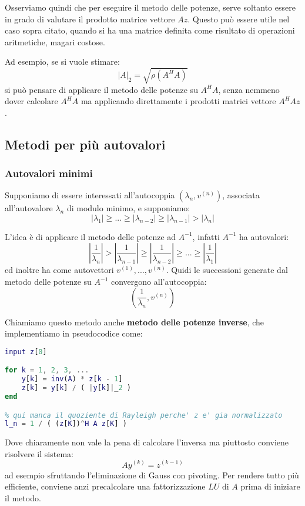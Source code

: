 \documentclass[a4paper,11pt]{article}
\begin{document}
Osserviamo quindi che per eseguire il metodo delle potenze, serve soltanto essere in grado di valutare il prodotto matrice vettore $A z$.
Questo può essere utile nel caso sopra citato, quando si ha una matrice definita come risultato di operazioni aritmetiche, magari costose.

Ad esempio, se si vuole stimare:
$$
|A|_2 = \sqrt{\rho(A^H A)}
$$
si può pensare di applicare il metodo delle potenze su $A^H A$, senza nemmeno dover calcolare $A^H A$ ma applicando direttamente i prodotti matrici vettore $A^H A z$.

\subsection{Metodi per più autovalori}
\subsubsection{Autovalori minimi}
Supponiamo di essere interessati all'autocoppia $(\lambda_n, v^{(n)})$, associata all'autovalore $\lambda_n$ di modulo minimo, e supponiamo:
$$
|\lambda_1| \geq ... \geq |\lambda_{n - 2}| \geq |\lambda_{n - 1}| > |\lambda_n|
$$

L'idea è di applicare il metodo delle potenze ad $A^{-1}$, infatti $A^{-1}$ ha autovalori:
$$
\left| \frac{1}{\lambda_n} \right| > \left| \frac{1}{\lambda_{n - 1}} \right| \geq \left| \frac{1}{\lambda_{n - 2}} \right| \geq ... \geq \left| \frac{1}{\lambda_1} \right|
$$
ed inoltre ha come autovettori $v^{(1)}, ..., v^{(n)}$.
Quidi le successioni generate dal metodo delle potenze su $A^{-1}$ convergono all'autocoppia:
$$
\left( \frac{1}{\lambda_n}, v^{(n)} \right)
$$

Chiamiamo questo metodo anche \textbf{metodo delle potenze inverse}, che implementiamo in pseudocodice come:
\begin{lstlisting}[language=MATLAB, style=codestyle]	
input z[0]

for k = 1, 2, 3, ...
	y[k] = inv(A) * z[k - 1]
	z[k] = y[k] / ( |y[k]|_2 )
end

% qui manca il quoziente di Rayleigh perche' z e' gia normalizzato 
l_n = 1 / ( (z[K])^H A z[K] )
\end{lstlisting}

Dove chiaramente non vale la pena di calcolare l'inversa ma piuttosto conviene risolvere il sistema:
$$
A y^{(k)} = z^{(k - 1)}
$$
ad esempio sfruttando l'eliminazione di Gauss con pivoting.
Per rendere tutto più efficiente, conviene anzi precalcolare una fattorizzazione $LU$ di $A$ prima di iniziare il metodo.
\end{document}
